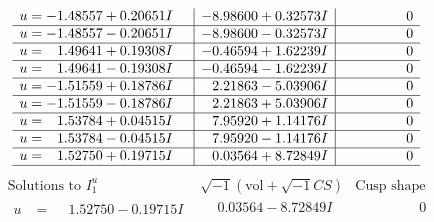 \documentclass[1p]{elsarticle_modified}
\theoremstyle{definition}
\newcommand{\I}{\sqrt{-1}}
\begin{document}
$$\begin{array}{c|c|c}
\begin{aligned}
u &= -1.48557 + 0.20651 I\end{aligned}
 & -8.98600 + 0.32573 I & \phantom{-0.000000 } 0 \\ \hline\begin{aligned}
u &= -1.48557 - 0.20651 I\end{aligned}
 & -8.98600 - 0.32573 I & \phantom{-0.000000 } 0 \\ \hline\begin{aligned}
u &= \phantom{-}1.49641 + 0.19308 I\end{aligned}
 & -0.46594 + 1.62239 I & \phantom{-0.000000 } 0 \\ \hline\begin{aligned}
u &= \phantom{-}1.49641 - 0.19308 I\end{aligned}
 & -0.46594 - 1.62239 I & \phantom{-0.000000 } 0 \\ \hline\begin{aligned}
u &= -1.51559 + 0.18786 I\end{aligned}
 & \phantom{-}2.21863 - 5.03906 I & \phantom{-0.000000 } 0 \\ \hline\begin{aligned}
u &= -1.51559 - 0.18786 I\end{aligned}
 & \phantom{-}2.21863 + 5.03906 I & \phantom{-0.000000 } 0 \\ \hline\begin{aligned}
u &= \phantom{-}1.53784 + 0.04515 I\end{aligned}
 & \phantom{-}7.95920 + 1.14176 I & \phantom{-0.000000 } 0 \\ \hline\begin{aligned}
u &= \phantom{-}1.53784 - 0.04515 I\end{aligned}
 & \phantom{-}7.95920 - 1.14176 I & \phantom{-0.000000 } 0 \\ \hline\begin{aligned}
u &= \phantom{-}1.52750 + 0.19715 I\end{aligned}
 & \phantom{-}0.03564 + 8.72849 I & \phantom{-0.000000 } 0\\
 \hline 
 \end{array}$$\newpage$$\begin{array}{c|c|c}  
\text{Solutions to }I^u_{1}& \I (\text{vol} + \sqrt{-1}CS) & \text{Cusp shape}\\
 \hline 
\begin{aligned}
u &= \phantom{-}1.52750 - 0.19715 I\end{aligned}
 & \phantom{-}0.03564 - 8.72849 I & \phantom{-0.000000 } 0 \\ \hline\begin{aligned}

\end{aligned}
\end{array}$$
\end{document}
